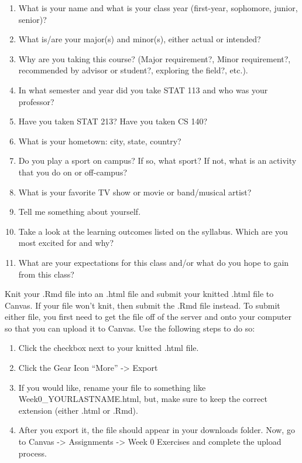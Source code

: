 \documentclass[
]{book}
\begin{document}
\begin{enumerate}
\def\labelenumi{\alph{enumi}.}
\item
  What is your name and what is your class year (first-year, sophomore, junior, senior)?
\item
  What is/are your major(s) and minor(s), either actual or intended?
\item
  Why are you taking this course? (Major requirement?, Minor requirement?, recommended by advisor or student?, exploring the field?, etc.).
\item
  In what semester and year did you take STAT 113 and who was your professor?
\item
  Have you taken STAT 213? Have you taken CS 140?
\item
  What is your hometown: city, state, country?
\item
  Do you play a sport on campus? If so, what sport? If not, what is an activity that you do on or off-campus?
\item
  What is your favorite TV show or movie or band/musical artist?
\item
  Tell me something about yourself.
\item
  Take a look at the learning outcomes listed on the syllabus. Which are you most excited for and why?
\item
  What are your expectations for this class and/or what do you hope to gain from this class?
\end{enumerate}

Knit your .Rmd file into an .html file and submit your knitted .html file to Canvas. If your file won't knit, then submit the .Rmd file instead. To submit either file, you first need to get the file off of the server and onto your computer so that you can upload it to Canvas. Use the following steps to do so:

\begin{enumerate}
\def\labelenumi{\arabic{enumi}.}
\item
  Click the checkbox next to your knitted .html file.
\item
  Click the Gear Icon ``More'' -\textgreater{} Export
\item
  If you would like, rename your file to something like Week0\_YOURLASTNAME.html, but, make sure to keep the correct extension (either .html or .Rmd).
\item
  After you export it, the file should appear in your downloads folder. Now, go to Canvas -\textgreater{} Assignments -\textgreater{} Week 0 Exercises and complete the upload process.
\end{enumerate}
\end{document}
